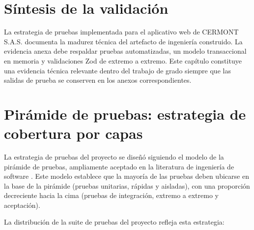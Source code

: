 \section{Síntesis de la validación}
\label{sec:sintesis-validacion}

La estrategia de pruebas implementada para el aplicativo web de CERMONT S.A.S. documenta la madurez técnica del artefacto de ingeniería construido. La evidencia anexa debe respaldar pruebas automatizadas, un modelo transaccional en memoria y validaciones Zod de extremo a extremo. Este capítulo constituye una evidencia técnica relevante dentro del trabajo de grado siempre que las salidas de prueba se conserven en los anexos correspondientes.

\section{Pirámide de pruebas: estrategia de cobertura por capas}
\label{sec:piramide-pruebas}

La estrategia de pruebas del proyecto se diseñó siguiendo el modelo de la pirámide de pruebas, ampliamente aceptado en la literatura de ingeniería de software \cite{pressman2020,sommerville2016}. Este modelo establece que la mayoría de las pruebas deben ubicarse en la base de la pirámide (pruebas unitarias, rápidas y aisladas), con una proporción decreciente hacia la cima (pruebas de integración, extremo a extremo y aceptación).

La distribución de la suite de pruebas del proyecto refleja esta estrategia:

